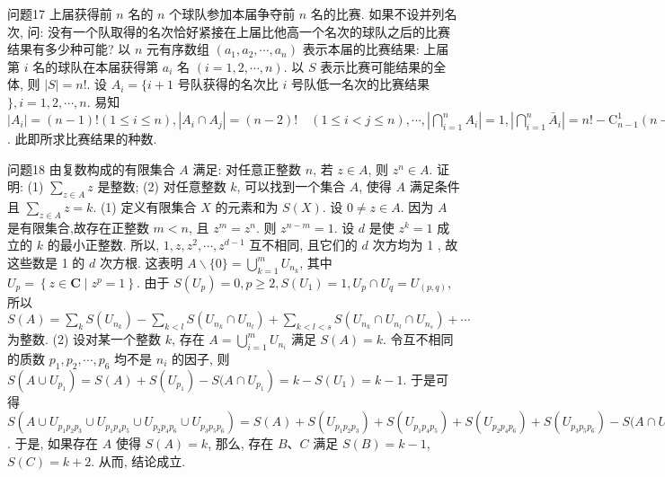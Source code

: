 问题17 上届获得前 $n$ 名的 $n$ 个球队参加本届争夺前 $n$ 名的比赛.
如果不设并列名次, 问: 没有一个队取得的名次恰好紧接在上届比他高一个名次的球队之后的比赛结果有多少种可能?
以 $n$ 元有序数组 $\left(a_1, a_2, \cdots, a_n\right)$ 表示本届的比赛结果: 上届第 $i$ 名的球队在本届获得第 $a_i$ 名 $(i=1,2, \cdots, n)$. 以 $S$ 表示比赛可能结果的全体, 则 $|S|=n !$. 设 $A_i=\{i+1$ 号队获得的名次比 $i$ 号队低一名次的比赛结果 $\}, i=1,2, \cdots, n$. 易知 $\left|A_i\right|=(n-1) !(1 \leqslant i \leqslant n),\left|A_i \cap A_j\right|= (n-2) ! \quad(1 \leqslant i<j \leqslant n), \cdots,\left|\bigcap_{i=1}^n A_i\right|=1, \left|\bigcap_{i=1}^n \bar{A}_i\right|=n !-\mathrm{C}_{n-1}^1(n- 1) !+\mathrm{C}_{n-1}^2(n-2) !+\cdots+(-1)^{n-1} \mathrm{C}_{n-1}^{n-1}$. 此即所求比赛结果的种数.



问题18 由复数构成的有限集合 $A$ 满足: 对任意正整数 $n$, 若 $z \in A$, 则 $z^n \in A$. 证明:
(1) $\sum_{z \in A} z$ 是整数;
(2) 对任意整数 $k$, 可以找到一个集合 $A$, 使得 $A$ 满足条件且 $\sum_{z \in A} z=k$. 
(1) 定义有限集合 $X$ 的元素和为 $S(X)$. 设 $0 \neq z \in A$. 因为 $A$ 是有限集合,故存在正整数 $m<n$, 且 $z^m=z^n$. 则 $z^{n-m}=1$. 设 $d$ 是使 $z^k=1$ 成立的 $k$ 的最小正整数.
所以, $1, z, z^2, \cdots, z^{d-1}$ 互不相同, 且它们的 $d$ 次方均为 1 , 故这些数是 1 的 $d$ 次方根.
这表明 $A \backslash\{0\}=\bigcup_{k=1}^m U_{n_k}$, 其中 $U_p= \left\{z \in \mathbf{C} \mid z^p=1\right\}$. 由于 $S\left(U_p\right)=0, p \geqslant 2, S\left(U_1\right)=1, U_p \cap U_q=U_{(p, q)}$, 所以 $S(A)=\sum_k S\left(U_{n_k}\right)-\sum_{k<l} S\left(U_{n_k} \cap U_{n_l}\right)+\sum_{k<l<s} S\left(U_{n_k} \cap U_{n_l} \cap U_{n_s}\right)+\cdots$ 为整数.
(2) 设对某一个整数 $k$, 存在 $A=\bigcup_{i=1}^m U_{n_i}$ 满足 $S(A)=k$. 令互不相同的质数 $p_1, p_2, \cdots, p_6$ 均不是 $n_i$ 的因子, 则 $S\left(A \cup U_{p_1}\right)=S(A)+S\left(U_{p_1}\right)-S(A \cap \left.U_{p_1}\right)=k-S\left(U_1\right)=k-1$. 于是可得 $S\left(A \cup U_{p_1 p_2 p_3} \cup U_{p_1 p_4 p_5} \cup U_{p_2 p_4 p_6} \cup\right. \left.U_{p_3 p_5 p_6}\right)=S(A)+S\left(U_{p_1 p_2 p_3}\right)+S\left(U_{p_1 p_4 p_5}\right)+S\left(U_{p_2 p_4 p_6}\right)+S\left(U_{p_3 p_5 p_6}\right)-S(A \cap \left.U_{p_1 p_2 p_3}\right)-\cdots+S\left(A \cap U_{p_1 p_2 p_3} \cap U_{p_1 p_4 p_5}\right)+\cdots-S\left(A \cap U_{p_1 p_2 p_3} \cap U_{p_1 p_4 p_5} \cap\right. \left.U_{p_2 p_4 p_6}\right)-\cdots+S\left(A \cap U_{p_1 p_2 p_3} \cap U_{p_1 p_4 p_5} \cap U_{p_2 p_4 p_6} \cap U_{p_3 p_5 p_6}\right)=k+4 \times 0- 4 S\left(U_1\right)-\sum_{k=1}^6 S\left(U_{p_k}\right)+10 S\left(U_1\right)-5 S\left(U_1\right)+S\left(U_1\right)=k-4+10-5+1= k+2$. 于是, 如果存在 $A$ 使得 $S(A)=k$, 那么, 存在 $B 、 C$ 满足 $S(B)=k-1$, $S(C)=k+2$. 从而, 结论成立.



